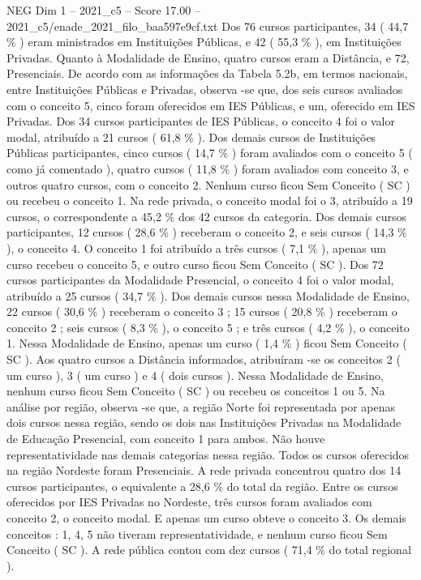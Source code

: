 \begin{textsample}{NEG Dim 1 – 2021\_c5 – Score 17.00 – 2021\_c5/enade\_2021\_filo\_baa597e9cf.txt}
Dos 76 cursos participantes, 34 ( 44,7 \% ) eram ministrados em Instituições Públicas, e 42 ( 55,3 \% ), em Instituições Privadas.
Quanto à Modalidade de Ensino, quatro cursos eram a Distância, e 72, Presenciais.
De acordo com as informações da Tabela 5.2b, em termos nacionais, entre Instituições Públicas e Privadas, observa -se que, dos seis cursos avaliados com o conceito 5, cinco foram oferecidos em IES Públicas, e um, oferecido em IES Privadas.
Dos 34 cursos participantes de IES Públicas, o conceito 4 foi o valor modal, atribuído a 21 cursos ( 61,8 \% ).
Dos demais cursos de Instituições Públicas participantes, cinco cursos ( 14,7 \% ) foram avaliados com o conceito 5 ( como já comentado ), quatro cursos ( 11,8 \% ) foram avaliados com conceito 3, e outros quatro cursos, com o conceito 2.
Nenhum curso ficou Sem Conceito ( SC ) ou recebeu o conceito 1.
Na rede privada, o conceito modal foi o 3, atribuído a 19 cursos, o correspondente a 45,2 \% dos 42 cursos da categoria.
Dos demais cursos participantes, 12 cursos ( 28,6 \% ) receberam o conceito 2, e seis cursos ( 14,3 \% ), o conceito 4.
O conceito 1 foi atribuído a três cursos ( 7,1 \% ), apenas um curso recebeu o conceito 5, e outro curso ficou Sem Conceito ( SC ).
Dos 72 cursos participantes da Modalidade Presencial, o conceito 4 foi o valor modal, atribuído a 25 cursos ( 34,7 \% ).
Dos demais cursos nessa Modalidade de Ensino, 22 cursos ( 30,6 \% ) receberam o conceito 3 ; 15 cursos ( 20,8 \% ) receberam o conceito 2 ; seis cursos ( 8,3 \% ), o conceito 5 ; e três cursos ( 4,2 \% ), o conceito 1.
Nessa Modalidade de Ensino, apenas um curso ( 1,4 \% ) ficou Sem Conceito ( SC ).
Aos quatro cursos a Distância informados, atribuíram -se os conceitos 2 ( um curso ), 3 ( um curso ) e 4 ( dois cursos ).
Nessa Modalidade de Ensino, nenhum curso ficou Sem Conceito ( SC ) ou recebeu os conceitos 1 ou 5.
Na análise por região, observa -se que, a região Norte foi representada por apenas dois cursos nessa região, sendo os dois nas Instituições Privadas na Modalidade de Educação Presencial, com conceito 1 para ambos.
Não houve representatividade nas demais categorias nessa região.
Todos os cursos oferecidos na região Nordeste foram Presenciais.
A rede privada concentrou quatro dos 14 cursos participantes, o equivalente a 28,6 \% do total da região.
Entre os cursos oferecidos por IES Privadas no Nordeste, três cursos foram avaliados com conceito 2, o conceito modal.
E apenas um curso obteve o conceito 3.
Os demais conceitos : 1, 4, 5 não tiveram representatividade, e nenhum curso ficou Sem Conceito ( SC ).
A rede pública contou com dez cursos ( 71,4 \% do total regional ).

\end{textsample}
